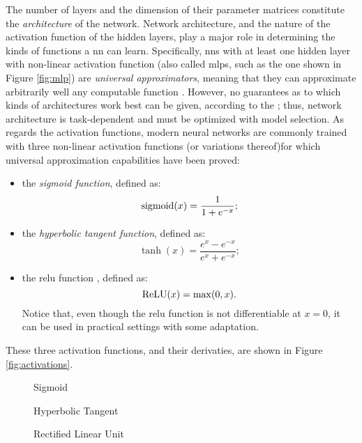 The number of layers and the dimension of their parameter matrices constitute the \emph{architecture} of the network. Network architecture, and the nature of the activation function of the hidden layers, play a major role in determining the kinds of functions a \gls{nn} can learn. Specifically, \glspl{nn} with at least one hidden layer with non-linear activation function (also called \glspl{mlp}, such as the one shown in Figure \ref{fig:mlp}) are \emph{universal approximators}, meaning that they can approximate arbitrarily well any computable function \citep{cybenko1998approximationuniversal}. However, no guarantees as to which kinds of architectures work best can be given, according to the  \citep{wolpert1997freelunchtheorem}; thus, network architecture is task-dependent and must be optimized with model selection. As regards the activation functions, modern neural networks are commonly trained with three non-linear activation functions (or variations thereof)for which universal approximation capabilities have been proved:
\begin{itemize}
    \item the \emph{sigmoid function}, defined as:
    $$\operatorname{sigmoid}(x) = \frac{1}{1 + e^{-x}};$$
    \item the \emph{hyperbolic tangent function}, defined as:
    $$\tanh(x) = \frac{e^x - e^{-x}}{e^x + e^{-x}};$$
    \item the \gls{relu} function \citep{glorot2011relu}, defined as:
    $$\operatorname{ReLU}(x) = \max(0, x).$$
    Notice that, even though the \gls{relu} function is not differentiable at $x = 0$, it can be used in practical settings with some adaptation.
\end{itemize}
These three activation functions, and their derivaties, are shown in Figure \ref{fig:activations}.
\begin{figure*}[h!]
    \begin{subfigure}[b]{0.32\linewidth}
        \centering
        \resizebox{.8\textwidth}{!}{}
        \caption{Sigmoid}
        \label{fig:sigmoid}
    \end{subfigure}
    \begin{subfigure}[b]{0.32\linewidth}
        \centering
        \resizebox{.8\textwidth}{!}{}
        \caption{Hyperbolic Tangent}
        \label{fig:hyptan}
    \end{subfigure}
    \begin{subfigure}[b]{0.32\linewidth}
        \centering
        \resizebox{.8\textwidth}{!}{}
        \caption{Rectified Linear Unit}
        \label{fig:relu}
    \end{subfigure}
    \caption{Examples of activation functions for the hidden layers (solid line) and their derivatives (dashed line).}
    \label{fig:activations}
\end{figure*}
